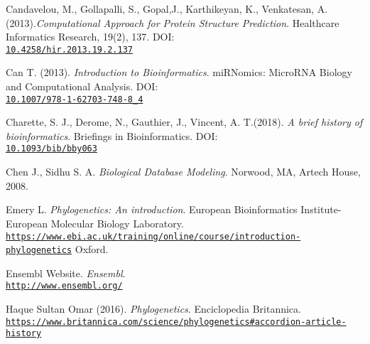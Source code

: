 \documentclass[twoside,openright,titlepage,fleqn,
,	headinclude,12pt,a4paper,BCOR5mm,footinclude,table]{scrbook}
\begin{document}
\begin{thebibliography}{50}
Candavelou, M., Gollapalli, S., Gopal,J., Karthikeyan, K., Venkatesan, A.(2013).\newline \textit{Computational Approach for Protein Structure Prediction}.\newline
Healthcare Informatics Research, 19(2), 137. \newline
DOI: \\\texttt{\url{10.4258/hir.2013.19.2.137}}

Can T. (2013).\newline
\textit{Introduction to Bioinformatics}.\newline
miRNomics: MicroRNA Biology and Computational Analysis.\newline
DOI: \\\texttt{\url{10.1007/978-1-62703-748-8_4}}

Charette, S. J., Derome, N., Gauthier, J., Vincent, A. T.(2018). \newline
\textit{A brief history of bioinformatics}. \newline
Briefings in Bioinformatics.\newline
DOI: \\\texttt{\url{10.1093/bib/bby063}}

Chen J., Sidhu S. A.\newline
\textit{Biological Database Modeling}.\newline
Norwood, MA, Artech House, 2008.

Emery L.\newline
\textit{Phylogenetics: An introduction}.\newline
European Bioinformatics Institute-European Molecular Biology Laboratory.
\\\texttt{\url{https://www.ebi.ac.uk/training/online/course/introduction-phylogenetics}}\newline
Oxford.

Ensembl Website.\newline
\textit{Ensembl}.
\\\texttt{\url{http://www.ensembl.org/}}

Haque Sultan Omar (2016).\newline
\textit{Phylogenetics}.\newline
Enciclopedia Britannica.
\\\texttt{\url{https://www.britannica.com/science/phylogenetics\#accordion-article-history}}


\end{thebibliography}
\end{document}
